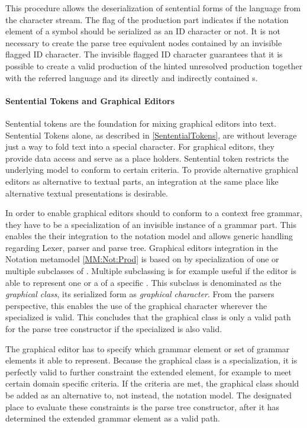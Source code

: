 This procedure allows the deserialization of sentential forms of the language from the character stream. The  flag of the production part indicates if the notation element of a symbol should be serialized as an ID character or not. It is not necessary to create the parse tree equivalent nodes contained by an invisible flagged ID character. The invisible flagged ID character guarantees that it is possible to create a valid production of the hinted unresolved production together with the referred language  and its directly and indirectly contained s.

\paragraph{Sentential Tokens and Graphical Editors}
Sentential tokens are the foundation for mixing graphical editors into text. Sentential Tokens alone, as described in \ref{SententialTokens}, are without leverage just a way to fold text into a special character.  For graphical editors, they provide data access and serve as a place holders. Sentential token restricts the underlying model to conform to certain criteria. To provide alternative graphical editors as alternative to textual parts, an integration at the same place like alternative textual presentations is desirable.

In order to enable graphical editors should to conform to a context free grammar, they have to be a specialization of an invisible instance of a grammar part. This enables the their integration to the notation model and allows generic handling regarding Lexer, parser and parse tree. Graphical editors integration in the Notation metamodel \ref{MM:Not:Prod} is based on by specialization of one or multiple subclasses of . Multiple subclassing is for example useful if the editor is able to represent one or a  of a specific . This subclass is denominated as the \emph{graphical class}, its serialized form as \emph{graphical character}. From the parsers perspective, this enables the use of the graphical character wherever the specialized  is valid. This concludes that the graphical class is only a valid path for the parse tree constructor if the specialized  is also valid. 

The graphical editor has to specify which grammar element or set of grammar elements it able to represent. Because the graphical class is a specialization, it is perfectly valid to further constraint the extended element, for example to meet certain domain specific criteria. If the criteria are met, the graphical class should be added as an alternative to, not instead, the notation model. The designated place to evaluate these constraints is the parse tree constructor, after it has determined the extended grammar element as a valid path. 

